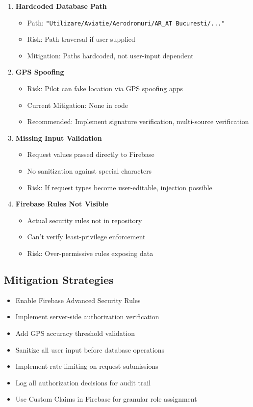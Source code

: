 \documentclass[11pt,a4paper]{report}
\begin{document}
\begin{enumerate}
    \item \textbf{Hardcoded Database Path}
    \begin{itemize}
        \item Path: \texttt{"Utilizare/Aviatie/Aerodromuri/AR_AT Bucuresti/..."}
        \item Risk: Path traversal if user-supplied
        \item Mitigation: Paths hardcoded, not user-input dependent
    \end{itemize}

    \item \textbf{GPS Spoofing}
    \begin{itemize}
        \item Risk: Pilot can fake location via GPS spoofing apps
        \item Current Mitigation: None in code
        \item Recommended: Implement signature verification, multi-source verification
    \end{itemize}

    \item \textbf{Missing Input Validation}
    \begin{itemize}
        \item Request values passed directly to Firebase
        \item No sanitization against special characters
        \item Risk: If request types become user-editable, injection possible
    \end{itemize}

    \item \textbf{Firebase Rules Not Visible}
    \begin{itemize}
        \item Actual security rules not in repository
        \item Can't verify least-privilege enforcement
        \item Risk: Over-permissive rules exposing data
    \end{itemize}
\end{enumerate}

\subsection{Mitigation Strategies}

\begin{itemize}
    \item Enable Firebase Advanced Security Rules
    \item Implement server-side authorization verification
    \item Add GPS accuracy threshold validation
    \item Sanitize all user input before database operations
    \item Implement rate limiting on request submissions
    \item Log all authorization decisions for audit trail
    \item Use Custom Claims in Firebase for granular role assignment
\end{itemize}
\end{document}
